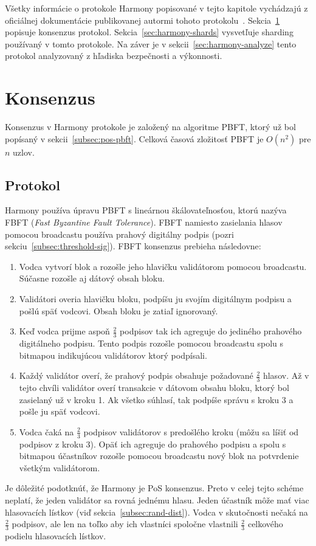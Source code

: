 Všetky informácie o protokole Harmony popisované v tejto kapitole vychádzajú z oficiálnej dokumentácie publikovanej autormi tohoto protokolu~\cite{harmonyWp}. Sekcia~\ref{sec:harmony-cons} popisuje konsenzus protokol. Sekcia~\ref{sec:harmony-shards} vysvetľuje sharding používaný v tomto protokole.  Na záver je v sekcii~\ref{sec:harmony-analyze} tento protokol analyzovaný z hľadiska bezpečnosti a výkonnosti.

\section{Konsenzus}\label{sec:harmony-cons}

Konsenzus v Harmony protokole je založený na algoritme PBFT, ktorý už bol popísaný v sekcii~\ref{subsec:pos-pbft}. Celková časová zložitosť PBFT je $O(n^2)$ pre $n$ uzlov.

\subsection{Protokol}\label{subsec:fbft}
Harmony používa úpravu PBFT s lineárnou škálovateľnosťou, ktorú nazýva FBFT (\textit{Fast Byzantine Fault Tolerance}). FBFT namiesto zasielania hlasov pomocou broadcastu používa prahový digitálny podpis (pozri sekciu~\ref{subsec:threshold-sig}). FBFT konsenzus prebieha následovne:
\begin{enumerate}
	\item Vodca vytvorí blok a rozošle jeho hlavičku validátorom pomocou broadcastu. Súčasne rozošle aj dátový obsah bloku.
	\item Validátori overia hlavičku bloku, podpíšu ju svojím digitálnym podpisu a pošlú späť vodcovi. Obsah bloku je zatiaľ ignorovaný.
	\item Keď vodca prijme aspoň $\frac{2}{3}$ podpisov tak ich agreguje do jediného prahového digitálneho podpisu. Tento podpis rozošle pomocou broadcastu spolu s bitmapou indikujúcou validátorov ktorý podpísali.
	\item Každý validátor overí, že prahový podpis obsahuje požadované $\frac{2}{3}$ hlasov. Až v tejto chvíli validátor overí transakcie v dátovom obsahu bloku, ktorý bol zasielaný už v kroku 1. Ak všetko súhlasí, tak podpíše správu s kroku 3 a pošle ju späť vodcovi.
	\item Vodca čaká na $\frac{2}{3}$ podpisov validátorov s predošlého kroku (môžu sa líšiť od podpisov z kroku 3). Opäť ich agreguje do prahového podpisu a spolu s bitmapou účastníkov rozošle pomocou broadcastu nový blok na potvrdenie všetkým validátorom. 
\end{enumerate}
Je dôležité podotknúť, že Harmony je PoS konsenzus. Preto v celej tejto schéme neplatí, že jeden validátor sa rovná jednému hlasu. Jeden účastník môže mať viac hlasovacích lístkov (viď sekcia~\ref{subsec:rand-dist}). Vodca v skutočnosti nečaká na $\frac{2}{3}$ podpisov, ale len na toľko aby ich vlastníci spoločne vlastnili $\frac{2}{3}$ celkového podielu hlasovacích lístkov.

